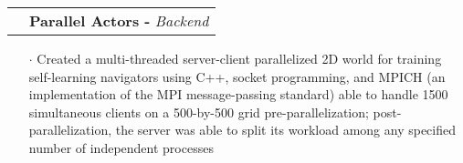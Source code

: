 \documentclass[a4paper, oneside, final]{scrartcl} %
\newcommand{\gray}{\rowcolor[gray]{.90}} %
\begin{document}
\begin{center}

  \begin{tabularx}{1.00\linewidth}{>{\raggedleft\scshape}p{0cm}X}
    \gray& \textbf{Parallel Actors -} \textit{Backend}\\
  \end{tabularx}
  \begin{itemize}\itemsep-0.2cm
      \vspace{-0.1cm}
    \item[$\cdot$] Created a multi-threaded server-client parallelized 2D world for training self-learning navigators using C++, socket programming, and MPICH (an implementation of the MPI message-passing standard) able to handle 1500 simultaneous clients on a 500-by-500 grid pre-parallelization; post-parallelization, the server was able to split its workload among any specified number of independent processes  \\
  \end{itemize}


\end{center}
\end{document}

